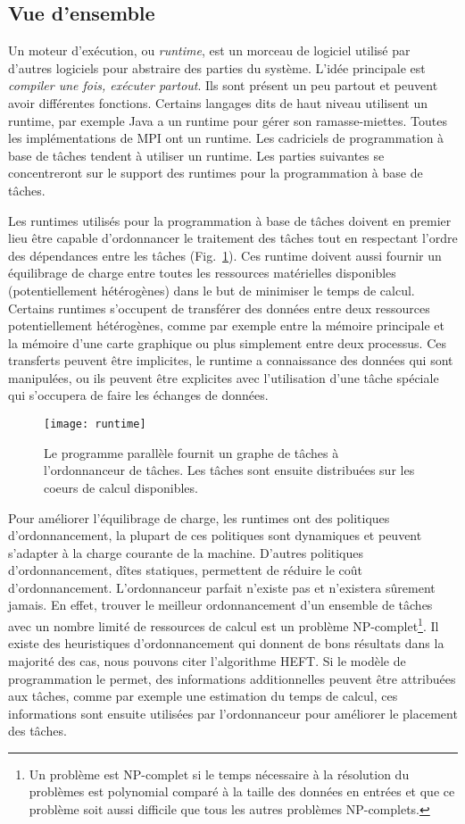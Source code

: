 \subsection{Vue d'ensemble}
Un moteur d'exécution, ou {\em runtime}, est un morceau de logiciel utilisé par d'autres logiciels pour abstraire des parties du système.
%
L'idée principale est {\em compiler une fois, exécuter partout}.
%
Ils sont présent un peu partout et peuvent avoir différentes fonctions.
%
Certains langages dits de haut niveau utilisent un runtime, par exemple Java a un runtime pour gérer son ramasse-miettes.
%
Toutes les implémentations de MPI ont un runtime.
%
Les cadriciels de programmation à base de tâches tendent à utiliser un runtime.
%
Les parties suivantes se concentreront sur le support des runtimes pour la programmation à base de tâches.


Les runtimes utilisés pour la programmation à base de tâches doivent en premier lieu être capable d'ordonnancer le traitement des tâches tout en respectant l'ordre des dépendances entre les tâches (Fig.~\ref{fig:runtime}).
%
Ces runtime doivent aussi fournir un équilibrage de charge entre toutes les ressources matérielles disponibles (potentiellement hétérogènes) dans le but de minimiser le temps de calcul.
%
Certains runtimes s'occupent de transférer des données entre deux ressources potentiellement hétérogènes, comme par exemple entre la mémoire principale et la mémoire d'une carte graphique ou plus simplement entre deux processus.
%
Ces transferts peuvent être implicites, le runtime a connaissance des données qui sont manipulées, ou ils peuvent être explicites avec l'utilisation d'une tâche spéciale qui s'occupera de faire les échanges de données.

\begin{figure}
  \centering
  \texttt{[image: runtime]}
  \caption{Le programme parallèle fournit un graphe de tâches à l'ordonnanceur de tâches. Les tâches sont ensuite distribuées sur les coeurs de calcul disponibles.}
  \label{fig:runtime}
\end{figure}


Pour améliorer l'équilibrage de charge, les runtimes ont des politiques d'ordonnancement, la plupart de ces politiques sont dynamiques et peuvent s'adapter à la charge courante de la machine.
%
D'autres politiques d'ordonnancement, dîtes statiques, permettent de réduire le coût d'ordonnancement.
%
L'ordonnanceur parfait n'existe pas et n'existera sûrement jamais.
%
En effet, trouver le meilleur ordonnancement d'un ensemble de tâches avec un nombre limité de ressources de calcul est un problème NP-complet\footnote{Un problème est NP-complet si le temps nécessaire à la résolution du problèmes est polynomial comparé à la taille des données en entrées et que ce problème soit aussi difficile que tous les autres problèmes NP-complets.}.
%
Il existe des heuristiques d'ordonnancement qui donnent de bons résultats dans la majorité des cas, nous pouvons citer l'algorithme HEFT\cite{heft}.
%
Si le modèle de programmation le permet, des informations additionnelles peuvent être attribuées aux tâches, comme par exemple une estimation du temps de calcul, ces informations sont ensuite utilisées par l'ordonnanceur pour améliorer le placement des tâches.


